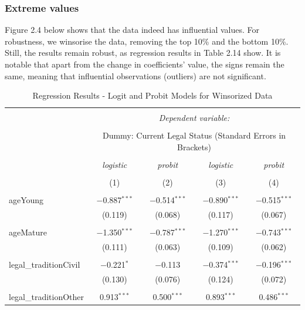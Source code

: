 \documentclass[a4paper, nobind]{templates/ociamthesis}
\begin{document}
\hypertarget{extreme-values}{%
\subsubsection{Extreme values}\label{extreme-values}}

Figure 2.4 below shows that the data indeed has influential values. For robustness, we winsorise the data, removing the top 10\% and the bottom 10\%. Still, the results remain robust, as regression results in Table 2.14 show. It is notable that apart from the change in coefficients' value, the signs remain the same, meaning that influential observations (outliers) are not significant.

\begin{table}[!htbp] \centering 
  \caption{Regression Results - Logit and Probit Models for Winsorized Data} 
  \label{} 
\footnotesize 
\begin{tabular}{@{\extracolsep{5pt}}lcccc} 
\\[-1.8ex]\hline 
\hline \\[-1.8ex] 
 & \multicolumn{4}{c}{\textit{Dependent variable:}} \\ 
\cline{2-5} 
\\[-1.8ex] & \multicolumn{4}{c}{Dummy: Current Legal Status (Standard Errors in Brackets)} \\ 
\\[-1.8ex] & \textit{logistic} & \textit{probit} & \textit{logistic} & \textit{probit} \\ 
\\[-1.8ex] & (1) & (2) & (3) & (4)\\ 
\hline \\[-1.8ex] 
 ageYoung & $-$0.887$^{***}$ & $-$0.514$^{***}$ & $-$0.890$^{***}$ & $-$0.515$^{***}$ \\ 
  & (0.119) & (0.068) & (0.117) & (0.067) \\ 
  & & & & \\ 
 ageMature & $-$1.350$^{***}$ & $-$0.787$^{***}$ & $-$1.270$^{***}$ & $-$0.743$^{***}$ \\ 
  & (0.111) & (0.063) & (0.109) & (0.062) \\ 
  & & & & \\ 
 legal\_traditionCivil & $-$0.221$^{*}$ & $-$0.113 & $-$0.374$^{***}$ & $-$0.196$^{***}$ \\ 
  & (0.130) & (0.076) & (0.124) & (0.072) \\ 
  & & & & \\ 
 legal\_traditionOther & 0.913$^{***}$ & 0.500$^{***}$ & 0.893$^{***}$ & 0.486$^{***}$ \\ 

\end{tabular}
\end{table}
\end{document}
